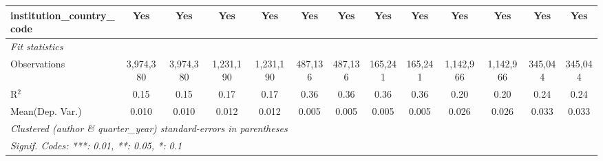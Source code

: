 \begin{tabular}{lcccccccccccc}
   institution\_country\_code               & Yes           & Yes             & Yes           & Yes             & Yes          & Yes           & Yes         & Yes            & Yes           & Yes            & Yes           & Yes\\  
   \midrule
   \emph{Fit statistics}\\
   Observations                             & 3,974,380     & 3,974,380       & 1,231,190     & 1,231,190       & 487,136      & 487,136       & 165,241     & 165,241        & 1,142,966     & 1,142,966      & 345,044       & 345,044\\  
   R$^2$                                    & 0.15          & 0.15            & 0.17          & 0.17            & 0.36         & 0.36          & 0.36        & 0.36           & 0.20          & 0.20           & 0.24          & 0.24\\  
Mean(Dep. Var.) & 0.010 & 0.010 & 0.012 & 0.012 & 0.005 & 0.005 & 0.005 & 0.005 & 0.026 & 0.026 & 0.033 & 0.033 \\
   \midrule \midrule
   \multicolumn{13}{l}{\emph{Clustered (author \& quarter\_year) standard-errors in parentheses}}\\
   \multicolumn{13}{l}{\emph{Signif. Codes: ***: 0.01, **: 0.05, *: 0.1}}\\
\end{tabular}
\par\endgroup

